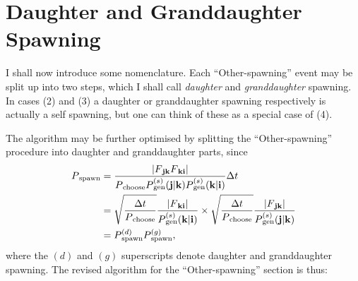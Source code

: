 \documentclass{article}
\newcommand{\fij}[2]{F\/_{\bf #1 #2} }
\newcommand{\Pgji}[2]{
P\/_{\text{gen}}^{(s)}({\bf #1}|{\bf #2})
}
\begin{document}
\hspace{10pt}






\section{Daughter and Granddaughter Spawning}
I shall now introduce some nomenclature. Each ``Other-spawning'' event may be split up into two steps, which I shall call {\em daughter\/} and {\em granddaughter\/} spawning. In cases (2) and (3) a daughter or granddaughter spawning respectively is actually a self spawning, but one can think of these as a special case of (4).

The algorithm may be further optimised by splitting the ``Other-spawning'' procedure into daughter and granddaughter parts, since
\begin{align}
P\/_{\text{spawn}} &=\frac{|\fij{j}{k}\fij{k}{i}|}{P\/_{\text{choose}}\Pgji{j}{k}\Pgji{k}{i}}  \Delta t \nonumber \\
&= \sqrt{\frac{\Delta t}{P\/_{\text{choose}}}}\frac{|\fij{k}{i}|}{\Pgji{k}{i}} \times \sqrt{\frac{\Delta t}{P\/_{\text{choose}}}}\frac{|\fij{j}{k}|}{\Pgji{j}{k}}    \nonumber \\
&= P\/_{\text{spawn}}^{(d)}  P\/_{\text{spawn}}^{(g)}, \nonumber 
\end{align}
where the $(d)$ and $(g)$ superscripts denote daughter and granddaughter spawning. The revised algorithm for the ``Other-spawning'' section is thus:

\hspace{10pt}
\end{document}
